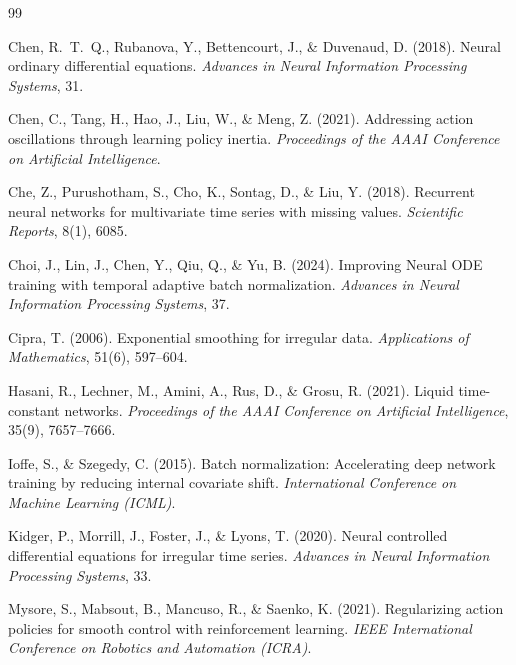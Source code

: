 \documentclass[11pt,a4paper]{article}
\begin{document}

\begin{thebibliography}{99}

Chen, R.~T.~Q., Rubanova, Y., Bettencourt, J., \& Duvenaud, D. (2018).
\newblock Neural ordinary differential equations.
\newblock \emph{Advances in Neural Information Processing Systems}, 31.

Chen, C., Tang, H., Hao, J., Liu, W., \& Meng, Z. (2021).
\newblock Addressing action oscillations through learning policy inertia.
\newblock \emph{Proceedings of the AAAI Conference on Artificial Intelligence}.

Che, Z., Purushotham, S., Cho, K., Sontag, D., \& Liu, Y. (2018).
\newblock Recurrent neural networks for multivariate time series with missing values.
\newblock \emph{Scientific Reports}, 8(1), 6085.

Choi, J., Lin, J., Chen, Y., Qiu, Q., \& Yu, B. (2024).
\newblock Improving Neural ODE training with temporal adaptive batch normalization.
\newblock \emph{Advances in Neural Information Processing Systems}, 37.

Cipra, T. (2006).
\newblock Exponential smoothing for irregular data.
\newblock \emph{Applications of Mathematics}, 51(6), 597--604.

Hasani, R., Lechner, M., Amini, A., Rus, D., \& Grosu, R. (2021).
\newblock Liquid time-constant networks.
\newblock \emph{Proceedings of the AAAI Conference on Artificial Intelligence},
  35(9), 7657--7666.

Ioffe, S., \& Szegedy, C. (2015).
\newblock Batch normalization: Accelerating deep network training by reducing
  internal covariate shift.
\newblock \emph{International Conference on Machine Learning (ICML)}.

Kidger, P., Morrill, J., Foster, J., \& Lyons, T. (2020).
\newblock Neural controlled differential equations for irregular time series.
\newblock \emph{Advances in Neural Information Processing Systems}, 33.

Mysore, S., Mabsout, B., Mancuso, R., \& Saenko, K. (2021).
\newblock Regularizing action policies for smooth control with reinforcement learning.
\newblock \emph{IEEE International Conference on Robotics and Automation (ICRA)}.


\end{thebibliography}
\end{document}
